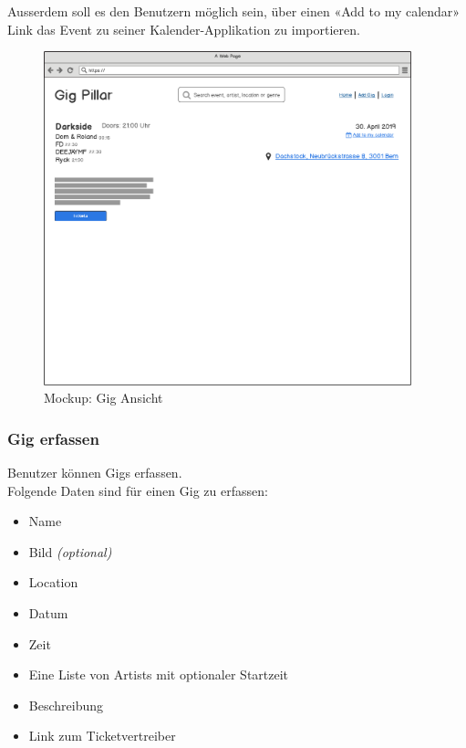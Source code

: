 \noindent
Ausserdem soll es den Benutzern möglich sein, über einen «Add to my calendar»
Link das Event zu seiner Kalender-Applikation zu importieren.

\begin{figure}[!htb]
  \centering
  \includegraphics[width=0.95\textwidth]{mockups/event.png}
  \caption{Mockup: Gig Ansicht}
\end{figure}

\clearpage
\subsubsection{Gig erfassen}

Benutzer können Gigs erfassen.\\

\noindent
Folgende Daten sind für einen Gig zu erfassen:

\begin{itemize}
  \tightlist{}
  \item{} Name
  \item{} Bild \textit{(optional)}
  \item{} Location
  \item{} Datum
  \item{} Zeit
  \item{} Eine Liste von Artists mit optionaler Startzeit
  \item{} Beschreibung
  \item{} Link zum Ticketvertreiber
\end{itemize}


